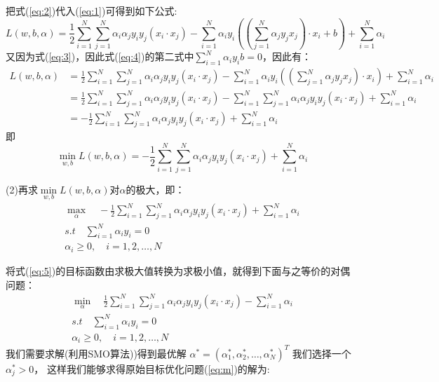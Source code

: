 \documentclass{article}
\begin{document}
 把式(\ref{eq:2})代入(\ref{eq:1})可得到如下公式:
\begin{equation}
    L(w,b,\alpha)=\frac{1}{2}\sum_{i=1}^{N} \sum_{j=1}^{N} \alpha_i \alpha_j y_i y_j (x_i\cdot x_j)-\sum_{i=1}^{N} \alpha_i y_i((\sum_{j=1}^{N}\alpha_j y_j x_j)\cdot x_i +b)+\sum_{i=1}^{N}\alpha_i  \label{eq:4}
\end{equation}
 又因为式(\ref{eq:3})，因此式(\ref{eq:4})的第二式中$\sum_{i=1}^{N}\alpha_i y_ib=0$，因此有：
\begin{align}
    L(w,b,\alpha)&=\frac{1}{2}\sum_{i=1}^{N} \sum_{j=1}^{N} \alpha_i \alpha_j y_i y_j (x_i\cdot x_j)-\sum_{i=1}^{N} \alpha_i y_i((\sum_{j=1}^{N}\alpha_j y_j x_j)\cdot x_i )+\sum_{i=1}^{N}\alpha_i\\
    &=\frac{1}{2}\sum_{i=1}^{N} \sum_{j=1}^{N} \alpha_i \alpha_j y_i y_j (x_i\cdot x_j)-\sum_{i=1}^{N} \sum_{j=1}^{N} \alpha_i \alpha_j y_i y_j (x_i\cdot x_j)+\sum_{i=1}^{N}\alpha_i\\
    &=-\frac{1}{2}\sum_{i=1}^{N} \sum_{j=1}^{N} \alpha_i \alpha_j y_i y_j (x_i\cdot x_j)+\sum_{i=1}^{N}\alpha_i
\end{align}
即
\begin{equation}
    \min\limits_{w,b}L(w,b,\alpha)=-\frac{1}{2}\sum_{i=1}^{N} \sum_{j=1}^{N} \alpha_i \alpha_j y_i y_j (x_i\cdot x_j)+\sum_{i=1}^{N}\alpha_i
\end{equation}

(2)再求$\min\limits_{w,b}L(w,b,\alpha)$对$\alpha$的极大，即：
\begin{gather}
    \max\limits_{\alpha} \quad -\frac{1}{2}\sum_{i=1}^{N} \sum_{j=1}^{N} \alpha_i \alpha_j y_i y_j (x_i\cdot x_j)+\sum_{i=1}^{N}\alpha_i  \label{eq:5}\\
    s.t \quad \sum_{i=1}^{N} \alpha_i y_i=0\\
    \alpha_i \ge 0,\quad i=1,2,\dots,N
\end{gather}

将式(\ref{eq:5})的目标函数由求极大值转换为求极小值，就得到下面与之等价的对偶问题：
\begin{gather}
    \min\limits_{\alpha} \quad \frac{1}{2}\sum_{i=1}^{N} \sum_{j=1}^{N} \alpha_i \alpha_j y_i y_j (x_i\cdot x_j)-\sum_{i=1}^{N}\alpha_i  \\
    s.t \quad \sum_{i=1}^{N} \alpha_i y_i=0\\
    \alpha_i \ge 0,\quad i=1,2,\dots,N
\end{gather}
我们需要{\color{red}求解}(利用{\color{red}SMO}算法))得到最优解{\color{red} $\alpha^*=(\alpha_1^*,\alpha_2^*,\dots,\alpha_N^*)^T$}
我们选择一个$\alpha_j^*>0$，
这样我们能够求得原始目标优化问题(\ref{eq:m})的解为:
\end{document}
